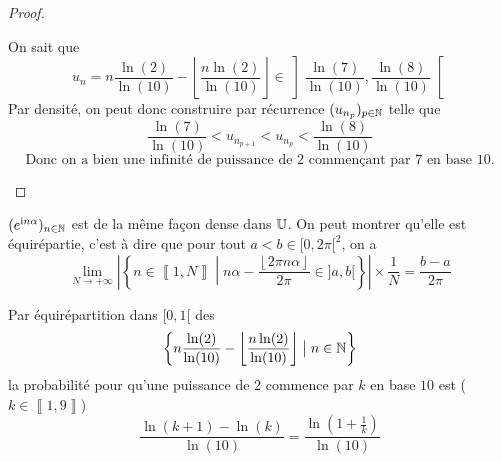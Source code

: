 \documentclass[12pt]{article}
\begin{document}
\begin{proof}
\begin{enumerate}
		On sait que 
		\begin{equation}
			u_{n}=n\frac{\ln(2)}{\ln(10)}-\left\lfloor\frac{n\ln(2)}{\ln(10)}\right\rfloor\in\left]\frac{\ln(7)}{\ln(10)},\frac{\ln(8)}{\ln(10)}\right[
		\end{equation}
		Par densité, on peut donc construire par récurrence $(u_{n_{p}})_{p\in\mathbb{N}}$ telle que 
		\begin{equation}
			\frac{\ln(7)}{\ln(10)}<u_{n_{p+1}}<u_{n_{p}}<\frac{\ln(8)}{\ln(10)}
		\end{equation}
		\begin{equation}
			\boxed{\text{Donc on a bien une infinité de puissance de 2 commençant par 7 en base 10.}}
		\end{equation}
	\end{enumerate}
\end{proof}

\begin{remark}
	$(e^{\mathrm{i}n\alpha})_{n\in\mathbb{N}}$ est de la même façon dense dans $\mathbb{U}$. On peut montrer qu'elle est équirépartie, c'est à dire que pour tout $a<b\in[0,2\pi[^{2}$, on a 
	\begin{equation}
		\lim\limits_{N\to+\infty}\left\vert\left\{n\in\left\llbracket 1,N\right\rrbracket\middle| n\alpha-\frac{\left\lfloor 2\pi n\alpha\right\rfloor}{2\pi}\in]a,b[\right\}\right\vert\times\frac{1}{N}=\frac{b-a}{2\pi}
	\end{equation}
\end{remark}

\begin{remark}
	Par équirépartition dans $[0,1[$ des 
	\begin{equation}
		\left\{n\frac{\ln(2)}{\ln(10)}-\left\lfloor\frac{n\ln(2)}{\ln(10)}\right\rfloor\bigm| n\in\mathbb{N}\right\}
	\end{equation}
	la probabilité pour qu'une puissance de $2$ commence par $k$ en base $10$ est ($k\in\left\llbracket 1,9\right\rrbracket$)
	\begin{equation}
		\frac{\ln(k+1)-\ln(k)}{\ln(10)}=\frac{\ln(1+\frac{1}{k})}{\ln(10)}
	\end{equation}
\end{remark}
\end{document}
